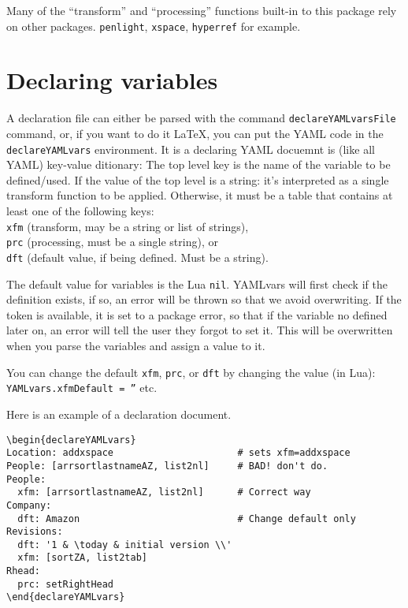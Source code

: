 \documentclass[11pt,parskip=half]{scrartcl}
\begin{document}
Many of the ``transform'' and ``processing'' functions built-in to this package rely on other packages.
\texttt{penlight},
\texttt{xspace},
\texttt{hyperref} for example.

\section{Declaring variables}
A declaration file can either be parsed with the command \texttt{declareYAMLvarsFile} command,
or, if you want to do it \LaTeX, you can put the YAML code in the \texttt{declareYAMLvars} environment.
It is a declaring YAML docuemnt is (like all YAML) key-value ditionary:
The top level key is the name of the variable to be defined/used.
If the value of the top level is a string: it's interpreted as a single transform function to be applied.
Otherwise, it must
be a table that contains at least one of the following keys:\\
\texttt{xfm} (transform, may be a string or list of strings),\\
\texttt{prc} (processing, must be a single string), or \\
\texttt{dft} (default value, if being defined. Must be a string).

The default value for variables is the Lua \texttt{nil}.
YAMLvars will first check if the definition exists, if so, an error will be thrown
so that we avoid overwriting.
If the token is available, it is set to a package error, so that if the variable no defined later on, an error will
tell the user they forgot to set it.
This will be overwritten when you parse the variables and assign a value to it.

You can change the default \texttt{xfm}, \texttt{prc}, or \texttt{dft} by changing
the value (in Lua): \texttt{YAMLvars.xfmDefault = ''} etc.

Here is an example of a declaration document.
\begin{verbatim}
\begin{declareYAMLvars}
Location: addxspace                      # sets xfm=addxspace
People: [arrsortlastnameAZ, list2nl]     # BAD! don't do.
People:
  xfm: [arrsortlastnameAZ, list2nl]      # Correct way
Company:
  dft: Amazon                            # Change default only
Revisions:
  dft: '1 & \today & initial version \\'
  xfm: [sortZA, list2tab]
Rhead:
  prc: setRightHead
\end{declareYAMLvars}
\end{verbatim}
\end{document}
